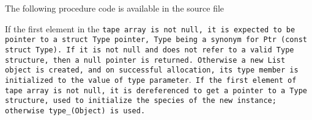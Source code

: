 The following procedure code is available in the source file

If the first element in the \tt{tape} array is not null,
it is expected to be pointer to a \tt{struct Type} pointer,
\tt{Type} being a synonym for \tt{Ptr (const struct Type)}.
If it is not null and does not refer to a valid
\tt{Type} structure, then a null pointer is returned.
Otherwise a new \tt{List} object is created, and on successful allocation,
its \tt{type} member is initialized to the value of \tt{type} parameter$.$
If the first element of \tt{tape} array is not null, it is dereferenced
to get a pointer to a \tt{Type} structure, used to initialize the
\tt{species} of the new instance; otherwise \tt{type_(Object)} is used.
